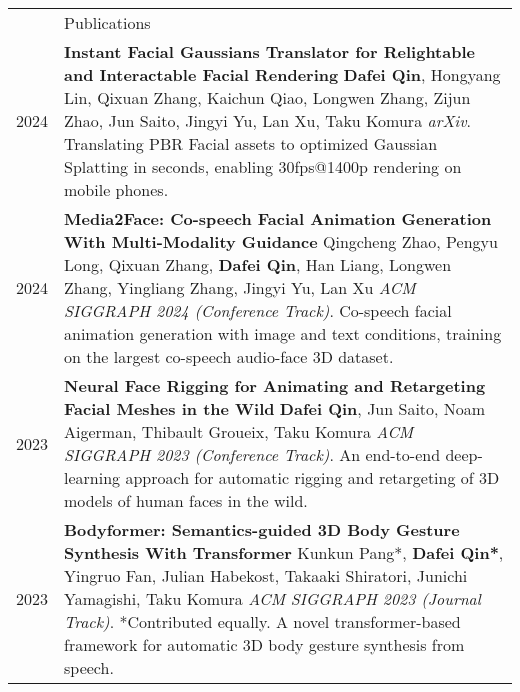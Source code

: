 \documentclass[letterpaper, 11pt]{article}
\newcommand{\headingfont}{\Large\color{OliveGreen}\vspace{-.4cm}}
\newenvironment{SectionTable}[1]{
	\renewcommand*{\arraystretch}{1.2}
	\setlength{\tabcolsep}{10pt} %
	\begin{longtable}{Rp{5.8in}} & #1 \\}
{\end{longtable}\vspace{-.4cm}}
\begin{document}
\begin{SectionTable}{\headingfont Publications} 

2024 & 
\textbf{Instant Facial Gaussians Translator for Relightable and Interactable Facial Rendering} \newline
\textbf{Dafei Qin}, Hongyang Lin, Qixuan Zhang, Kaichun Qiao, Longwen Zhang, Zijun Zhao, Jun Saito, Jingyi Yu, Lan Xu, Taku Komura \newline
\textit{arXiv}. \newline
Translating PBR Facial assets to optimized Gaussian Splatting in seconds, enabling 30fps@1400p rendering on mobile phones. \\

2024 & 
\textbf{Media2Face: Co-speech Facial Animation Generation With Multi-Modality Guidance} \newline
Qingcheng Zhao, Pengyu Long, Qixuan Zhang, \textbf{Dafei Qin}, Han Liang, Longwen Zhang, Yingliang Zhang, Jingyi Yu, Lan Xu \newline
\textit{ACM SIGGRAPH 2024 (Conference Track)}. \newline
Co-speech facial animation generation with image and text conditions, training on the largest co-speech audio-face 3D dataset. \\

2023 & 
\textbf{Neural Face Rigging for Animating and Retargeting Facial Meshes in the Wild} \newline
\textbf{Dafei Qin}, Jun Saito, Noam Aigerman, Thibault Groueix, Taku Komura \newline
\textit{ACM SIGGRAPH 2023 (Conference Track)}. \newline
An end-to-end deep-learning approach for automatic rigging and retargeting of 3D models of human faces in the wild. 
  \\

2023 & 
\textbf{Bodyformer: Semantics-guided 3D Body Gesture Synthesis With Transformer} \newline
Kunkun Pang*, \textbf{Dafei Qin*}, Yingruo Fan, Julian Habekost, Takaaki Shiratori, Junichi Yamagishi, Taku Komura \newline
\textit{ACM SIGGRAPH 2023 (Journal Track)}. \newline
*Contributed equally. \newline
A novel transformer-based framework for automatic 3D body gesture synthesis from speech. 

 \\


\end{SectionTable}
\end{document}
